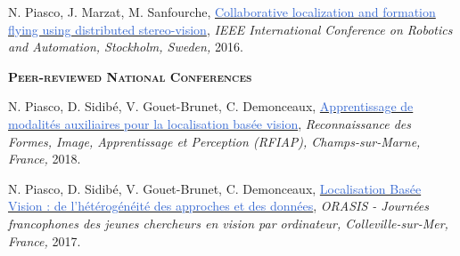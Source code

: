 \documentclass[]{friggeri-cv-cust}
\begin{document}
	{\footnotesize{N. Piasco, J. Marzat, M. Sanfourche, \href{http://julien.marzat.free.fr/Publications/2016\%20ICRA/2016_ICRA_Collaborative_localization_formation_flying_distributed_stereo-vision.pdf}{\textcolor{highlight}{Collaborative localization and formation ﬂying using distributed stereo-vision}},
\textit{IEEE International Conference on Robotics and Automation, Stockholm, Sweden,} 2016.}}	

	\vspace{0.5cm}
    \textsc{\textbf{Peer-reviewed National Conferences}}
    
    {\footnotesize{N. Piasco, D. Sidibé, V. Gouet-Brunet, C. Demonceaux, \href{https://rfiap2018.ign.fr/sites/default/files/ARTICLES/RFIAP_2018/RFIAP_2018_Piasco_Apprentissage.pdf}{\textcolor{highlight}{Apprentissage de modalités auxiliaires pour la localisation basée vision}},
\textit{Reconnaissance des Formes, Image, Apprentissage et Perception (RFIAP), Champs-sur-Marne, France,} 2018.}}

\footnotesize{N. Piasco, D. Sidibé, V. Gouet-Brunet, C. Demonceaux, \href{http://recherche.ign.fr/labos/matis/img/ic_pdf.gif}{\textcolor{highlight}{Localisation Basée Vision : de l’hétérogénéité des approches et des données}},
\textit{ORASIS - Journées francophones des jeunes chercheurs en vision par ordinateur, Colleville-sur-Mer, France,} 2017.}
    


% 
\end{document}
